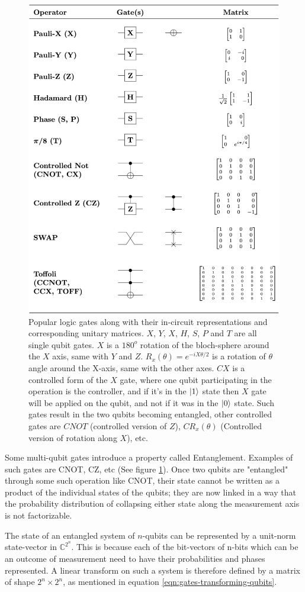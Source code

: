 \begin{figure}[!ht]
    \centering
    \includegraphics[width=0.6\linewidth]{figures/quantum/quantum_logic_gates.png}
    \caption[List of Logic Gates]{Popular logic gates along with their in-circuit representations and corresponding unitary matrices. $X$, $Y$, $X$, $H$, $S$, $P$ and $T$ are all single qubit gates. $X$ is a $180^o$ rotation of the bloch-sphere around the $X$ axis, same with $Y$ and $Z$. $R_x(\theta) = e^{-i X \theta / 2}$ is a rotation of $\theta$ angle around the X-axis, same with the other axes. $CX$ is a controlled form of the $X$ gate, where one qubit participating in the operation is the controller, and if it's in the $\ket{1}$ state then $X$ gate will be applied on the qubit, and not if it was in the $\ket{0}$ state. Such gates result in the two qubits becoming entangled, other controlled gates are $CNOT$ (controlled version of $Z$), $CR_x(\theta)$ (Controlled version of rotation along $X$), etc. \cite{book-nielsen-chuang}}
    \label{fig:quantum-unitary-gates}
\end{figure}

Some multi-qubit gates introduce a property called Entanglement. Examples of such gates are CNOT, CZ, etc (See figure \ref{fig:quantum-unitary-gates}). Once two qubits are "entangled" through some such operation like CNOT, their state cannot be written as a product of the individual states of the qubits; they are now linked in a way that the probability distribution of collapsing either state along the measurement axis is not factorizable. 

The state of an entangled system of $n$-qubits can be represented by a unit-norm state-vector in $\mathbb{C}^{2^n}$. This is because each of the bit-vectors of n-bits which can be an outcome of measurement need to have their probabilities and phases represented. A linear transform on such a system is therefore defined by a matrix of shape $2^n \times 2^n$, as mentioned in equation \ref{eqn:gates-transforming-qubits}.

